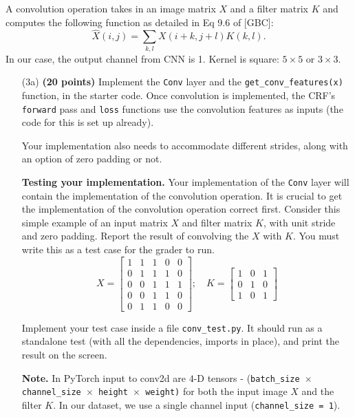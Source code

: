 \documentclass[11pt]{report}
\begin{document}
A convolution operation takes in an image matrix $X$ and a filter matrix $K$ and
computes the following function as detailed in Eq 9.6 of [GBC]:
%
\begin{equation}
  \label{eq:conv}
  \hat{X}(i,j) = \sum_{k,l} X(i + k, j+l) K(k,l).
\end{equation}
In our case, the output channel from CNN is 1.
Kernel is square: $5 \times 5$ or $3 \times 3$.

%
\begin{itemize}
\item[(3a)] \textbf{(20 points)} Implement the \texttt{Conv} layer and the
\texttt{get\_conv\_features(x)} function, in the starter code. Once
convolution is implemented, the CRF's \texttt{forward} pass and \texttt{loss}
functions use the convolution features as inputs (the code for this is set up
already).

Your implementation also needs to accommodate different strides,
along with an option of zero padding or not.

\textbf{Testing your implementation.} Your implementation of the {\tt Conv}
layer will contain the implementation of the convolution operation.
It is crucial to get the implementation
of the convolution operation correct first. Consider this simple example of an
input matrix $X$ and filter matrix $K$, with unit stride and zero padding.
Report the result of convolving the $X$ with $K$. You must write this as a test
case for the grader to run.
%
\[
X = \begin{bmatrix}
1 & 1 & 1 & 0 & 0 \\
0 & 1 & 1 & 1 & 0\\
0 & 0 & 1 & 1 & 1\\
0 & 0 & 1 & 1 & 0\\
0 & 1 & 1 & 0 & 0
\end{bmatrix} ; \quad
K = \begin{bmatrix}
1 & 0 & 1 \\
0 & 1 & 0 \\
1 & 0 & 1
\end{bmatrix}
\]

Implement your test case inside a file {\tt conv\_test.py}. It should run
as a standalone test (with all the dependencies, imports in place),
and print the result on the screen.

{\bf Note.} In PyTorch input to conv2d are \(4\)-D tensors - {(\tt batch\_size
	$\times$ channel\_size $\times$ height $\times$ weight)} for both the input
image $X$ and the filter $K$. In our dataset, we use a single channel input
({\tt channel\_size = 1}).


\end{itemize}
\end{document}
